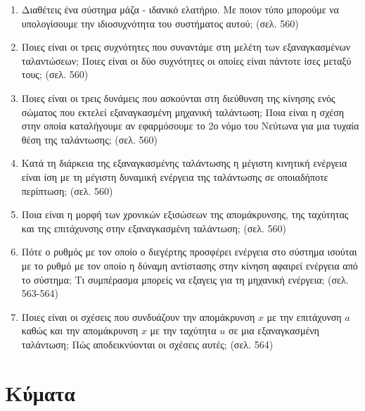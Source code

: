 \documentclass{article}
\begin{document}
\begin{enumerate}
      \item Διαθέτεις ένα σύστημα μάζα - ιδανικό ελατήριο. Με ποιον τύπο μπορούμε να υπολογίσουμε την ιδιοσυχνότητα του συστήματος αυτού; (σελ. 560)

      \item Ποιες είναι οι τρεις συχνότητες που συναντάμε στη μελέτη των εξαναγκασμένων ταλαντώσεων; Ποιες είναι οι δύο συχνότητες οι οποίες είναι πάντοτε ίσες μεταξύ τους; (σελ. 560)

      \item Ποιες είναι οι τρεις δυνάμεις που ασκούνται στη διεύθυνση της κίνησης ενός σώματος που εκτελεί εξαναγκασμένη μηχανική ταλάντωση; Ποια είναι η σχέση στην οποία καταλήγουμε αν εφαρμόσουμε το 2ο νόμο του Νεύτωνα για μια τυχαία θέση της ταλάντωσης; (σελ. 560)

      \item Κατά τη διάρκεια της εξαναγκασμένης ταλάντωσης η μέγιστη κινητική ενέργεια είναι ίση με τη μέγιστη δυναμική ενέργεια της ταλάντωσης σε οποιαδήποτε περίπτωση; (σελ. 560)

      \item Ποια είναι η μορφή των χρονικών εξισώσεων της απομάκρυνσης, της ταχύτητας και της επιτάχυνσης στην εξαναγκασμένη ταλάντωση; (σελ. 560)

      \item Πότε ο ρυθμός με τον οποίο ο διεγέρτης προσφέρει ενέργεια στο σύστημα ισούται με το ρυθμό με τον οποίο η δύναμη αντίστασης στην κίνηση αφαιρεί ενέργεια από το σύστημα; Τι συμπέρασμα μπορείς να εξαγεις για τη μηχανική ενέργεια; (σελ. 563-564)

      \item Ποιες είναι οι σχέσεις που συνδυάζουν την απομάκρυνση $x$ με την επιτάχυνση $a$ καθώς και την απομάκρυνση $x$ με την ταχύτητα $u$ σε μια εξαναγκασμένη ταλάντωση; Πώς αποδεικνύονται οι σχέσεις αυτές; (σελ. 564)
\end{enumerate}

\section{Κύματα}
\end{document}
